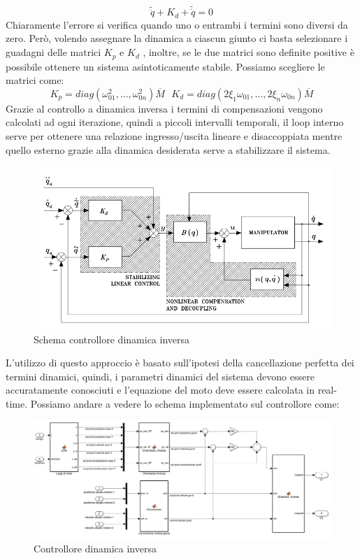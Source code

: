 \begin{equation}
\tilde{\ddot{q}} + K_d + \tilde{\dot{q}} = 0
\end{equation}
Chiaramente l'errore si verifica quando uno o entrambi i termini sono diversi da zero.  Però, volendo assegnare la dinamica a ciascun giunto ci basta selezionare  i guadagni delle matrici $K_p$ e $K_d$ , inoltre, se le due matrici sono definite positive è possibile ottenere un sistema asintoticamente stabile. 
Possiamo scegliere le matrici come:
\begin{equation*}
K_p = diag(\omega^2_{01}, \dots, \omega^2_{0n}) \overline{M} \ \ \  K_d = diag(2 \xi_1 \omega_{01}, \dots ,2 \xi_n \omega_{0n}) \overline{M} 
\end{equation*}
Grazie al controllo a dinamica inversa i termini di compensazioni vengono calcolati ad ogni iterazione, quindi a piccoli intervalli temporali, il loop interno serve per ottenere una relazione ingresso/uscita lineare e disaccoppiata mentre quello esterno grazie alla dinamica desiderata serve a stabilizzare il sistema.
\begin{figure}[ht]
	\begin{center}
		\includegraphics[scale=0.9]{Immagini/Controllori/IDTeoria}
		\caption{Schema controllore dinamica inversa}
		\label{fig:IDBraccia}
	\end{center}
\end{figure}
L'utilizzo di questo approccio è basato sull'ipotesi della cancellazione perfetta dei termini dinamici, quindi, i parametri dinamici del sistema devono essere accuratamente conosciuti e l'equazione del moto deve essere calcolata in real-time. Possiamo andare a vedere lo schema implementato sul controllore come:
\begin{figure}[ht]
	\begin{center}
		\includegraphics[scale=0.32]{Immagini/Controllori/SchemaID}
		\caption{Controllore dinamica inversa}
		\label{fig:IDRBraccia}
	\end{center}
\end{figure}
